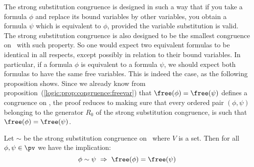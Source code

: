 The strong substitution congruence is designed in such a way that if
you take a formula $\phi$ and replace its bound variables by other
variables, you obtain a formula $\psi$ which is equivalent to
$\phi$, provided the variable substitution is valid. The strong
substitution congruence is also designed to be the smallest
congruence on \pv\ with such property. So one would expect two
equivalent formulas to be identical in all respects, except possibly
in relation to their bound variables. In particular, if a formula
$\phi$ is equivalent to a formula $\psi$, we should expect both
formulas to have the same free variables. This is indeed the case,
as the following proposition shows. Since we already know from
proposition~(\ref{logic:prop:congruence:freevar}) that
$\free(\phi)=\free(\psi)$ defines a congruence on \pv, the proof
reduces to making sure that every ordered pair $(\phi,\psi)$
belonging to the generator $R_{0}$ of the strong substitution
congruence, is such that $\free(\phi)=\free(\psi)$.
\begin{prop}\label{logic:prop:strong:freevar}
Let $\sim$ be the strong substitution congruence on \pv\ where $V$
is a set. Then for all $\phi,\psi\in\pv$ we have the implication:
    \[
    \phi\sim\psi\ \Rightarrow\ \free(\phi)=\free(\psi)
    \]
\end{prop}
